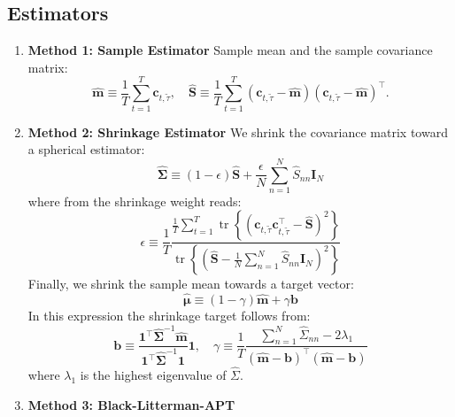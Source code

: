 \documentclass[13pt]{article}
\theoremstyle{definition}
\theoremstyle{remark}
\begin{document}
\subsection{Estimators}
\begin{enumerate}
    \item \textbf{Method 1: Sample Estimator} Sample mean and the sample covariance matrix:
$$
\widehat{\mathbf{m}} \equiv \frac{1}{T} \sum_{t=1}^T \mathbf{c}_{t, \tilde{\tau}}, \quad \widehat{\mathbf{S}} \equiv \frac{1}{T} \sum_{t=1}^T\left(\mathbf{c}_{t, \tilde{\tau}}-\widehat{\mathbf{m}}\right)\left(\mathbf{c}_{t, \tilde{\tau}}-\widehat{\mathbf{m}}\right)^{\top} .
$$
\item \textbf{Method 2: Shrinkage Estimator} We shrink the covariance matrix toward a spherical estimator:
$$
\widehat{\mathbf{\Sigma}} \equiv(1-\epsilon) \widehat{\mathbf{S}}+\frac{\epsilon}{N} \sum_{n=1}^N \widehat{S}_{n n} \mathbf{I}_N
$$
where from  the shrinkage weight reads:
$$
\epsilon \equiv \frac{1}{T} \frac{\frac{1}{T} \sum_{t=1}^T \operatorname{tr}\left\{\left(\mathbf{c}_{t, \tilde{\tau}} \mathbf{c}_{t, \tilde{\tau}}^{\top}-\widehat{\mathbf{S}}\right)^2\right\}}{\operatorname{tr}\left\{\left(\widehat{\mathbf{S}}-\frac{1}{N} \sum_{n=1}^N \widehat{S}_{n n} \mathbf{I}_N\right)^2\right\}}
$$
Finally, we shrink the sample mean towards a target vector:
$$
\widehat{\boldsymbol{\mu}} \equiv(1-\gamma) \widehat{\mathbf{m}}+\gamma \mathbf{b}
$$
In this expression the shrinkage target follows from:
$$
\mathbf{b} \equiv \frac{\mathbf{1}^{\top} \widehat{\mathbf{\Sigma}}^{-1} \widehat{\mathbf{m}}}{\mathbf{1}^{\top} \widehat{\mathbf{\Sigma}}^{-1} \mathbf{1}} \mathbf{1}, \quad \gamma \equiv \frac{1}{T} \frac{\sum_{n=1}^N \widehat{\Sigma}_{n n}-2 \lambda_1}{(\widehat{\mathbf{m}}-\mathbf{b})^{\top}(\widehat{\mathbf{m}}-\mathbf{b})}
$$
where $\lambda_1$ is the highest eigenvalue of $\widehat{\Sigma}$.
\item \textbf{Method 3: Black-Litterman-APT}\label{item:Black-Litterman-APT}



\end{enumerate}
\end{document}
